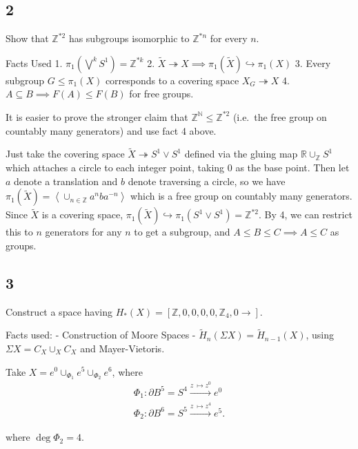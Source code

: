\hypertarget{section-6}{%
\subsection{2}\label{section-6}}

Show that \({\mathbb{Z}}^{\ast 2}\) has subgroups isomorphic to
\({\mathbb{Z}}^{\ast n}\) for every \(n\).

\begin{solution}

Facts Used 1. \(\pi_1(\bigvee^k S^1) = {\mathbb{Z}}^{\ast k}\) 2.
\(\tilde X \twoheadrightarrow X \implies \pi_1(\tilde X) \hookrightarrow\pi_1(X)\)
3. Every subgroup \(G \leq \pi_1(X)\) corresponds to a covering space
\(X_G \twoheadrightarrow X\) 4.
\(A \subseteq B \implies F(A) \leq F(B)\) for free groups.

It is easier to prove the stronger claim that
\({\mathbb{Z}}^{\mathbb{N}}\leq {\mathbb{Z}}^{\ast 2}\) (i.e.~the free
group on countably many generators) and use fact 4 above.

Just take the covering space
\(\tilde X \twoheadrightarrow S^1 \vee S^1\) defined via the gluing map
\({\mathbb{R}}\cup_{{\mathbb{Z}}} S^1\) which attaches a circle to each
integer point, taking 0 as the base point. Then let \(a\) denote a
translation and \(b\) denote traversing a circle, so we have
\(\pi_1(\tilde X) = \left<\cup_{n\in{\mathbb{Z}}}a^nba^{-n}\right>\)
which is a free group on countably many generators. Since \(\tilde X\)
is a covering space,
\(\pi_1(\tilde X) \hookrightarrow\pi_1(S^1 \vee S^1) = {\mathbb{Z}}^{\ast 2}\).
By 4, we can restrict this to \(n\) generators for any \(n\) to get a
subgroup, and \(A\leq B \leq C \implies A \leq C\) as groups.

\end{solution}

\hypertarget{section-7}{%
\subsection{3}\label{section-7}}

Construct a space having
\(H_*(X) = [{\mathbb{Z}}, 0, 0, 0, 0, {\mathbb{Z}}_4, 0\rightarrow]\).

\begin{solution}

Facts used: - Construction of Moore Spaces -
\(\tilde H_n(\Sigma X) = \tilde H_{n-1}(X)\), using
\(\Sigma X = C_X \cup_X C_X\) and Mayer-Vietoris.

Take \(X = e^0 \cup_{\Phi_1} e^5 \cup_{\Phi_2} e^6\), where
\begin{align*} \Phi_1: {\partial}B^5 = S^4 \xrightarrow{z~\mapsto z^0} e^0 \\ \Phi_2: {\partial}B^6 = S^5 \xrightarrow{z~\mapsto z^4} e^5 .\end{align*}

where \(\deg \Phi_2 = 4\).

\end{solution}

